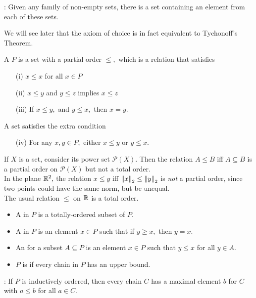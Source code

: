 \begin{frame*}
\noindent {}: Given any family of non-empty sets, there is a set containing an element from each of these sets.
\end{frame*}
\noindent We will see later that the axiom of choice is in fact equivalent to Tychonoff's Theorem.

\begin{defn}
A  $P$ is a set with a partial order $\leq,$ which is a relation that satisfies
\begin{enumerate}
\item[(i)] $x\leq x$ for all $x\in P$
\item[(ii)] $x\leq y$ and $y\leq z$ implies $x\leq z$
\item[(iii)] If $x\leq y,$ and $y\leq x,$ then $x=y.$
\end{enumerate}
A  set satisfies the extra condition
\begin{enumerate}
\item[(iv)] For any $x,y\in P,$ either $x\leq y$ or $y\leq x.$
\end{enumerate}
\end{defn}

\noindent\Ex If $X$ is a set, consider its power set $\mathcal{P}(X).$ Then the relation $A\leq B$ iff $A\subseteq B$ is a partial order on $\mathcal{P}(X)$ but not a total order. \\
\Ex In the plane $\mathbb{R}^{2},$ the relation $x\leq y$ iff $\left\lVert x\right\rVert_2\leq\left\lVert y\right\rVert_2$ is \textit{not} a partial order, since two points could have the same norm, but be unequal. \\
\Ex The usual relation $\leq$ on $\mathbb{R}^{}$ is a total order.

\begin{defn}
\begin{itemize}
\item A  in $P$ is a totally-ordered subset of $P.$
\item A  in $P$ is an element $x\in P$ such that if $y\geq x,$ then $y=x.$
\item An  for a subset $A\subseteq P$ is an element $x\in P$ such that $y\leq x$ for all $y\in A.$
\item $P$ is  if every chain in $P$ has an upper bound.
\end{itemize}
\end{defn}

\begin{frame*}
\noindent {}: If $P$ is inductively ordered, then every chain $C$ has a maximal element $b$ for $C$ with $a\leq b$ for all $a\in C.$
\end{frame*}

